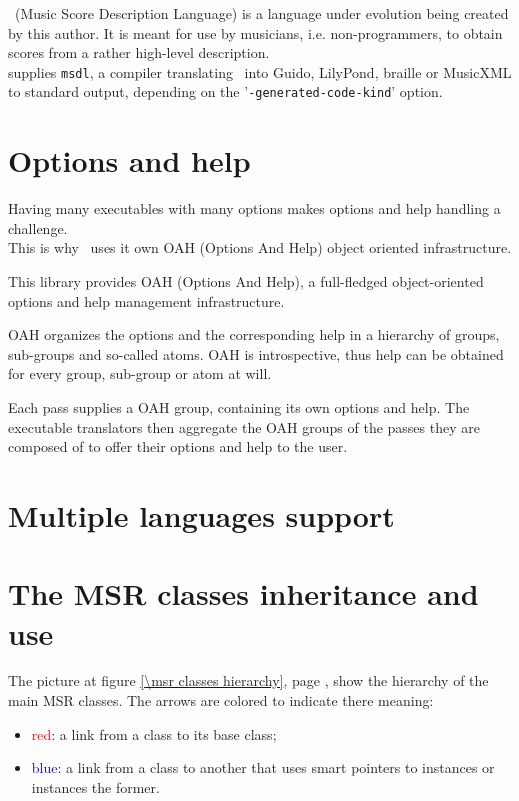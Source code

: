 \documentclass[12pt,a4paper]{article}
\begin{document}
\msdl\ (Music Score Description Language) is a language under evolution being created by this author. It is meant for use by musicians, i.e. non-programmers, to obtain scores from a rather high-level description.\\
\lib supplies {\tt msdl}, a compiler translating \msdl\ into Guido, LilyPond, braille or MusicXML to standard output, depending on the '{\tt -generated-code-kind}' option.


\section{Options and help}

Having many executables with many options makes options and help handling a challenge.\\
This is why \lib\ uses it own OAH (Options And Help) object oriented infrastructure.

This library provides OAH (Options And Help), a full-fledged object-oriented options and help management infrastructure.

OAH organizes the options and the corresponding help in a hierarchy of groups, sub-groups and so-called atoms. OAH is introspective, thus help can be obtained for every group, sub-group or atom at will.

Each pass supplies a OAH group, containing its own options and help. The executable translators then aggregate the OAH groups of the passes they are composed of to offer their options and help to the user.


\section{Multiple languages support}


\section{The MSR classes inheritance and use}

The picture at figure \ref {\msr classes hierarchy}, page \pageref {\msr classes hierarchy}, show the hierarchy of the main MSR classes. The  arrows are colored to indicate there meaning:
\begin{itemize}

\item  \textcolor{red}{red}: a link from a class to its base class;

\item  \textcolor{blue}{blue}: a link from a class to another that uses smart pointers to instances or instances the former.
\end{itemize}
\end{document}
